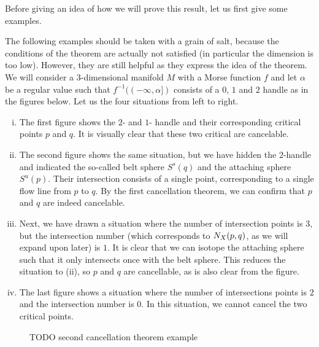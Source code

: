 Before giving an idea of how we will prove this result, let us first give some examples.
\begin{eg}
    The following examples should be taken with a grain of salt, because the conditions of the theorem are actually not satisfied (in particular the dimension is too low).
    However, they are still helpful as they express the idea of the theorem.
    We will consider a $3$-dimensional manifold $M$ with a Morse function $f$ and let $\alpha$ be a regular value such that  $f^{-1}((-\infty, \alpha])$ consists of a $0$, $1$ and  $2$ handle as in the figures below.
    Let us the four situations from left to right.
    \begin{enumerate}[(i)]
        \item The first figure shows the $2$- and  $1$- handle and their corresponding critical points $p$ and  $q$.
            It is visually clear that these two critical are cancelable.
        \item The second figure shows the same situation, but we have hidden the $2$-handle and indicated the so-called belt sphere $S^{s}(q)$ and the attaching sphere $S^{u}(p)$. Their intersection consists of a single point, corresponding to a single flow line from $p$ to $q$. 
            By the first cancellation theorem, we can confirm that $p$ and  $q$ are indeed cancelable.
        \item Next, we have drawn a situation where the number of intersection points is $3$, but the intersection number (which corresponds to $N_{X}(p, q)$, as we will expand upon later) is $1$. It is clear that we can isotope the attaching sphere such that it only intersects once with the belt sphere.
            This reduces the situation to (ii), so $p$ and  $q$ are cancellable, as is also clear from the figure. 
        \item The last figure shows a situation where the number of intersections points is $2$ and the intersection number is $0$. In this situation, we cannot cancel the two critical points.
    \end{enumerate}
    \begin{figure}[H]
    \centering
    \caption{TODO second cancellation theorem example}
    \label{fig:second-cancellation-theorem-example}
\end{figure}
\end{eg}

